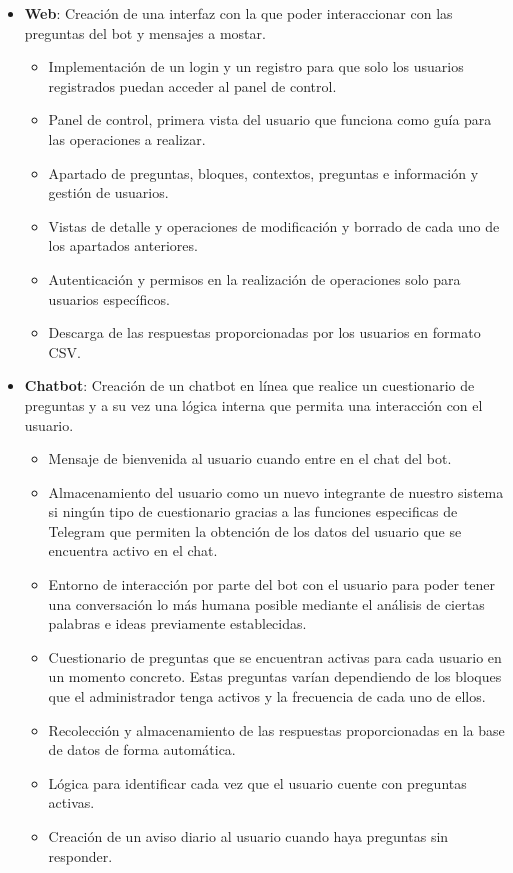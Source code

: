 \begin{itemize}
\item \textbf{Web}: Creación de una interfaz con la que poder interaccionar con las preguntas del bot y mensajes a mostar.
\begin{itemize}
\item Implementación de un login y un registro para que solo los usuarios registrados puedan acceder al panel de control.
\item Panel de control, primera vista del usuario que funciona como guía para las operaciones a realizar.
\item Apartado de preguntas, bloques, contextos, preguntas e información y gestión de usuarios.
\item Vistas de detalle y operaciones de modificación y borrado de cada uno de los apartados anteriores.
\item Autenticación y permisos en la realización de operaciones solo para usuarios específicos.
\item Descarga de las respuestas proporcionadas por los usuarios en formato CSV.

\end{itemize}
\item \textbf{Chatbot}: Creación de un chatbot en línea que realice un cuestionario de preguntas y a su vez una lógica interna que permita una interacción con el usuario.
\begin{itemize}
\item Mensaje de bienvenida al usuario cuando entre en el chat del bot.
\item Almacenamiento del usuario como un nuevo integrante de nuestro sistema si ningún tipo de cuestionario gracias a las funciones especificas de Telegram que permiten la obtención de los datos del usuario que se encuentra activo en el chat.
\item Entorno de interacción por parte del bot con el usuario para poder tener una conversación lo más humana posible mediante el análisis de ciertas palabras e ideas previamente establecidas.
\item Cuestionario de preguntas que se encuentran activas para cada usuario en un momento concreto. Estas preguntas varían dependiendo de los bloques que el administrador tenga activos y la frecuencia de cada uno de ellos.
\item Recolección y almacenamiento de las respuestas proporcionadas en la base de datos de forma automática.
\item Lógica para identificar cada vez que el usuario cuente con preguntas activas.
\item Creación de un aviso diario al usuario cuando haya preguntas sin responder.
\end{itemize}
\end{itemize}

